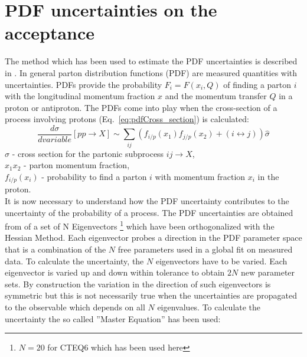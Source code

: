 \section{PDF uncertainties on the acceptance}
\label{sec:pdf}
The method which has been used to estimate the PDF uncertainties is described in \cite{Bourilkov:2006cj}.
In general parton distribution functions (PDF) are measured quantities with uncertainties. PDFs provide the probability $F_{i}=F(x_{i},Q)$ of finding a parton $i$ with the longitudinal momentum fraction $x$ and the momentum transfer $Q$ in a proton or antiproton.
The PDFs come into play when the cross-section of a process involving protons (Eq.~\ref{eq:pdfCross_section}) is calculated:
\begin{equation}
\frac{d\sigma}{d \xspace variable} [pp \rightarrow X] \sim \sum_{ij} (f_{i/p}(x_{1})f_{j/p}(x_{2})+(i\leftrightarrow j))\hat \sigma
 \label{eq:pdfCross_section}
\end{equation}
$\hat \sigma \xspace$ -  cross section for the partonic subprocess $ij\rightarrow X$, \\
$x_{1}x_{2} \xspace $ - parton momentum fraction, \\
$f_{i/p}(x_{i}) \xspace $ - probability to find a parton $i$ with momentum fraction $x_{i}$ in the proton.\\
\vspace*{3mm}
It is now necessary to understand how the PDF uncertainty contributes to the uncertainty of the probability of a process. The PDF uncertainties are obtained from of a set of N Eigenvectors \footnote{$N=20$ for CTEQ6 which has been used here} which have been orthogonalized with the Hessian Method. Each eigenvector probes a direction in the PDF parameter space that is a combination of the $N$ free parameters used in a global fit on measured data. To calculate the uncertainty, the $N$ eigenvectors have to be varied.
Each eigenvector is varied up and down within tolerance to obtain $2N$ new parameter sets. By construction the variation in the direction of such eigenvectors is symmetric but this is not necessarily true when the uncertainties are propagated to the observable which depends on all $N$ eigenvalues. To calculate the uncertainty the so called ''Master Equation''\cite{Bourilkov:2006cj} has been used:

